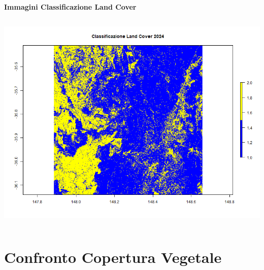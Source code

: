 \documentclass{beamer}
\begin{document}
\begin{frame}{\textbf{Immagini Classificazione Land Cover}}
\begin{columns}
    \centering
    \includegraphics[width=\textwidth]{Land_Cover_2024.png}
\end{columns}
\end{frame}

\section{Confronto Copertura Vegetale}
\end{document}

